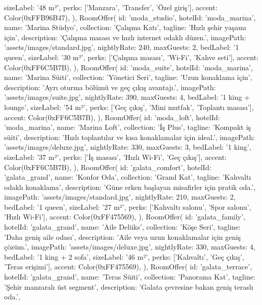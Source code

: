 \documentclass[11pt,a4paper]{article}
\begin{document}
\begin{codeblock}
    sizeLabel: '48 m²',
    perks: ['Manzara', 'Transfer', 'Özel giriş'],
    accent: Color(0xFFB96B47),
  ),
  RoomOffer(
    id: 'moda_studio',
    hotelId: 'moda_marina',
    name: 'Marina Stüdyo',
    collection: 'Çalışma Katı',
    tagline: 'Hızlı şehir yaşamı için',
    description: 'Çalışma masası ve hızlı internet odaklı düzen.',
    imagePath: 'assets/images/standard.jpg',
    nightlyRate: 240,
    maxGuests: 2,
    bedLabel: '1 queen',
    sizeLabel: '30 m²',
    perks: ['Çalışma masası', 'Wi-Fi', 'Kahve seti'],
    accent: Color(0xFF6C5B7B),
  ),
  RoomOffer(
    id: 'moda_suite',
    hotelId: 'moda_marina',
    name: 'Marina Süiti',
    collection: 'Yönetici Seri',
    tagline: 'Uzun konaklama için',
    description: 'Ayrı oturma bölümü ve geç çıkış avantajı.',
    imagePath: 'assets/images/suite.jpg',
    nightlyRate: 390,
    maxGuests: 4,
    bedLabel: '1 king + lounge',
    sizeLabel: '54 m²',
    perks: ['Geç çıkış', 'Mini mutfak', 'Toplantı masası'],
    accent: Color(0xFF6C5B7B),
  ),
  RoomOffer(
    id: 'moda_loft',
    hotelId: 'moda_marina',
    name: 'Marina Loft',
    collection: 'İş Plus',
    tagline: 'Kompakt iş süiti',
    description: 'Hızlı toplantılar ve kısa konaklamalar için ideal.',
    imagePath: 'assets/images/deluxe.jpg',
    nightlyRate: 330,
    maxGuests: 3,
    bedLabel: '1 king',
    sizeLabel: '37 m²',
    perks: ['İş masası', 'Hızlı Wi-Fi', 'Geç çıkış'],
    accent: Color(0xFF6C5B7B),
  ),
  RoomOffer(
    id: 'galata_comfort',
    hotelId: 'galata_grand',
    name: 'Konfor Oda',
    collection: 'Grand Kat',
    tagline: 'Kahvaltı odaklı konaklama',
    description: 'Güne erken başlayan misafirler için pratik oda.',
    imagePath: 'assets/images/standard.jpg',
    nightlyRate: 210,
    maxGuests: 2,
    bedLabel: '1 queen',
    sizeLabel: '27 m²',
    perks: ['Kahvaltı salonu', 'Spor salonu', 'Hızlı Wi-Fi'],
    accent: Color(0xFF475569),
  ),
  RoomOffer(
    id: 'galata_family',
    hotelId: 'galata_grand',
    name: 'Aile Delüks',
    collection: 'Köşe Seri',
    tagline: 'Daha geniş aile odası',
    description: 'Aile veya uzun konaklamalar için geniş çözüm.',
    imagePath: 'assets/images/deluxe.jpg',
    nightlyRate: 330,
    maxGuests: 4,
    bedLabel: '1 king + 2 sofa',
    sizeLabel: '46 m²',
    perks: ['Kahvaltı', 'Geç çıkış', 'Teras erişimi'],
    accent: Color(0xFF475569),
  ),
  RoomOffer(
    id: 'galata_terrace',
    hotelId: 'galata_grand',
    name: 'Teras Süiti',
    collection: 'Panorama Kat',
    tagline: 'Şehir manzaralı üst segment',
    description: 'Galata çevresine bakan geniş teraslı oda.',

\end{codeblock}
\end{document}
